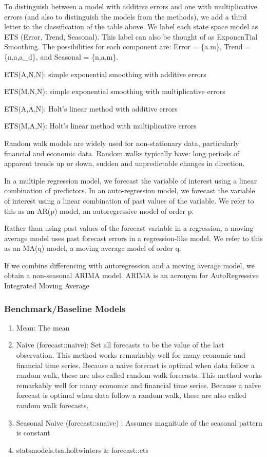 \documentclass[]{book}
\begin{document}
To distinguish between a model with additive errors and one with multiplicative errors (and also to distinguish the models from the methods), we add a third letter to the classification of the table above. We label each state space model as ETS (Error, Trend, Seasonal). This label can also be thought of as ExponenTial Smoothing. The possibilities for each component are: Error = \{a.m\}, Trend = \{n,a,a\_d\}, and Seasonal = \{n,a,m\}.

ETS(A,N,N): simple exponential smoothing with additive errors

ETS(M,N,N): simple exponential smoothing with multiplicative errors

ETS(A,A,N): Holt's linear method with additive errors

ETS(M,A,N): Holt's linear method with multiplicative errors

Random walk models are widely used for non-stationary data, particularly financial and economic data. Random walks typically have: long periods of apparent trends up or down, sudden and unpredictable changes in direction.

In a multiple regression model, we forecast the variable of interest using a linear combination of predictors. In an auto-regression model, we forecast the variable of interest using a linear combination of past values of the variable. We refer to this as an AR(p) model, an autoregressive model of order p.

Rather than using past values of the forecast variable in a regression, a moving average model uses past forecast errors in a regression-like model. We refer to this as an MA(q) model, a moving average model of order q.

If we combine differencing with autoregression and a moving average model, we obtain a non-seasonal ARIMA model. ARIMA is an acronym for AutoRegressive Integrated Moving Average

\hypertarget{benchmarkbaseline-models}{%
\subsubsection{Benchmark/Baseline Models}\label{benchmarkbaseline-models}}

\begin{enumerate}
\def\labelenumi{\arabic{enumi}.}
\setcounter{enumi}{-1}
\item
  Mean: The mean
\item
  Naive (forecast::naive): Set all forecasts to be the value of the last observation. This method works remarkably well for many economic and financial time series. Because a naive forecast is optimal when data follow a random walk, these are also called random walk forecasts. This method works remarkably well for many economic and financial time series. Because a naïve forecast is optimal when data follow a random walk, these are also called random walk forecasts.
\item
  Seasonal Naive (forecast::snaive) : Assumes magnitude of the seasonal pattern is constant
\item
  statsmodels.tsa.holtwinters \& forecast::ets
\end{enumerate}
\end{document}
